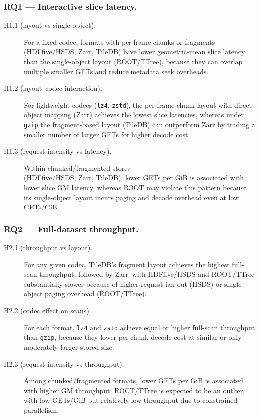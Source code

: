 \documentclass[nomenclature, english, bibtex]{kththesis}
\numberwithin{listing}{chapter}
\begin{document}
\subsubsection{RQ1 — Interactive slice latency.}
\begin{description}
  \item[H1.1 (layout vs single-object).] For a fixed codec, formats with per-frame chunks or fragments (\gls{HDFfive}/\gls{HSDS}, Zarr, TileDB) have lower geometric-mean slice latency than the single-object layout (\gls{ROOT}/\gls{TTree}), because they can overlap multiple smaller GETs and reduce metadata seek overheads.
  \item[H1.2 (layout–codec interaction).] For lightweight codecs (\texttt{lz4}, \texttt{zstd}), the per-frame chunk layout with direct object mapping (Zarr) achieves the lowest slice latencies, whereas under \texttt{gzip} the fragment-based layout (TileDB) can outperform Zarr by trading a smaller number of larger GETs for higher decode cost.
  \item[H1.3 (request intensity vs latency).] Within chunked/fragmented stores \\(\gls{HDFfive}/\gls{HSDS}, Zarr, TileDB), lower GETs per GiB is associated with lower slice \gls{GM} latency, whereas \gls{ROOT} may violate this pattern because its single-object layout incurs paging and decode overhead even at low GETs/GiB.
\end{description}


\subsubsection{RQ2 — Full-dataset throughput.}
\begin{description}
  \item[H2.1 (throughput vs layout).] For any given codec, TileDB’s fragment layout achieves the highest full-scan throughput, followed by Zarr, with \gls{HDFfive}/\gls{HSDS} and \gls{ROOT}/\gls{TTree} substantially slower because of higher request fan-out (\gls{HSDS}) or single-object paging overhead (\gls{ROOT}/\gls{TTree}).
  \item[H2.2 (codec effect on scans).] For each format, \texttt{lz4} and \texttt{zstd} achieve equal or higher full-scan throughput than \texttt{gzip}, because they lower per-chunk decode cost at similar or only moderately larger stored size.
  \item[H2.3 (request intensity vs throughput).] Among chunked/fragmented formats, lower GETs per GiB is associated with higher \gls{GM} throughput; \gls{ROOT}/\gls{TTree} is expected to be an outlier, with low GETs/GiB but relatively low throughput due to constrained parallelism.
\end{description}
\end{document}
